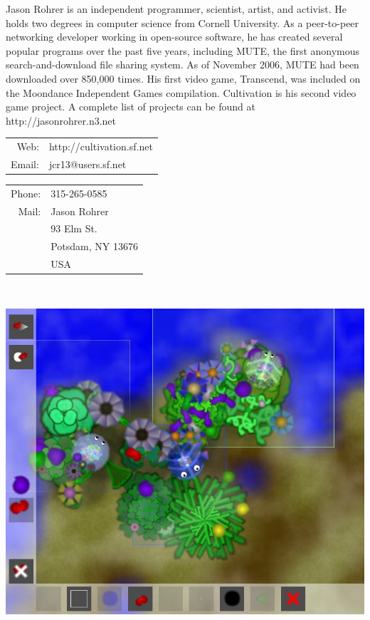 \documentclass[12pt]{article}
\begin{document}
\vspace{0.125in}


Jason Rohrer is an independent programmer, scientist, artist, and activist.  He holds two degrees in computer science from Cornell University.  As a peer-to-peer networking developer working in open-source software, he has created several popular programs over the past five years, including MUTE, the first anonymous search-and-download file sharing system.  As of November 2006, MUTE had been downloaded over 850,000 times.  His first video game, Transcend, was included on the Moondance Independent Games compilation.  Cultivation is his second video game project.  A complete list of projects can be found at http://jasonrohrer.n3.net

\vspace{0.25in}

\begin{center}
\begin{tabular}[t]{rl}
Web:  & http://cultivation.sf.net  \\  
Email:  & jcr13@users.sf.net\\
\end{tabular}  
\begin{tabular}[t]{rl}
Phone: &315-265-0585\\ 
Mail:& Jason Rohrer\\ 
&93 Elm St.\\  
&Potsdam, NY 13676\\  
&USA
\end{tabular}
\end{center}

\newpage

\begin{center}

~

\vspace{2in}

\includegraphics[scale=2]{../../html/press/cultivation.jpg}
\end{center}
\end{document}
